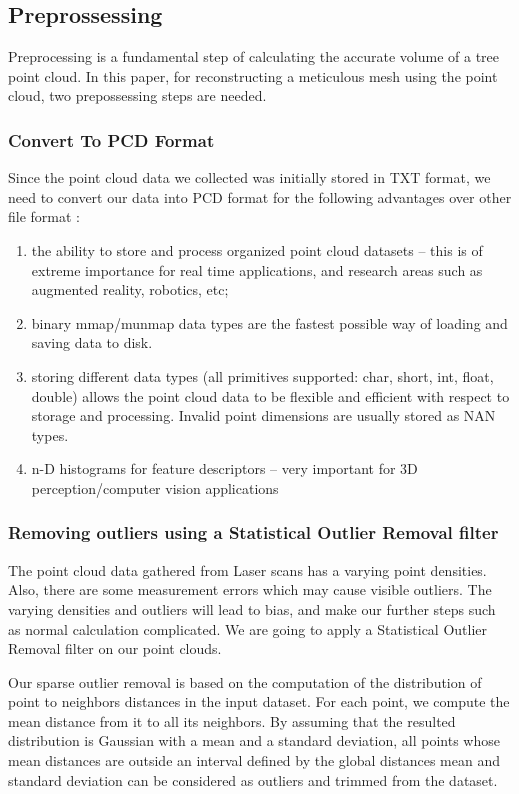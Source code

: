 \documentclass[runningheads,a4paper]{llncs}
\begin{document}
\subsection{Preprossessing}
Preprocessing is a fundamental step of calculating the accurate volume of a tree point cloud. In this paper, for reconstructing a meticulous mesh using the point cloud, two prepossessing steps are needed. 
\subsubsection{Convert To PCD Format}
Since the point cloud data we collected was initially stored in TXT format, we need to convert our data into PCD format for the following advantages over other file format \cite{11}:
\begin{enumerate}
\item the ability to store and process organized point cloud datasets – this is of extreme importance for real time applications, and research areas such as augmented reality, robotics, etc;
\item binary mmap/munmap data types are the fastest possible way of loading and saving data to disk.
\item storing different data types (all primitives supported: char, short, int, float, double) allows the point cloud data to be flexible and efficient with respect to storage and processing. Invalid point dimensions are usually stored as NAN types.
\item n-D histograms for feature descriptors – very important for 3D perception/computer vision applications
\end{enumerate}


\subsubsection{Removing outliers using a Statistical Outlier Removal filter}
The point cloud data gathered from Laser scans has a varying point densities. Also, there are some measurement errors which may cause visible outliers. The varying densities and outliers will lead to bias, and make our further steps such as normal calculation complicated. We are going to apply a Statistical Outlier Removal filter on our point clouds.

Our sparse outlier removal is based on the computation of the distribution of point to neighbors distances in the input dataset. For each point, we compute the mean distance from it to all its neighbors. By assuming that the resulted distribution is Gaussian with a mean and a standard deviation, all points whose mean distances are outside an interval defined by the global distances mean and standard deviation can be considered as outliers and trimmed from the dataset\cite{12}.
\end{document}
